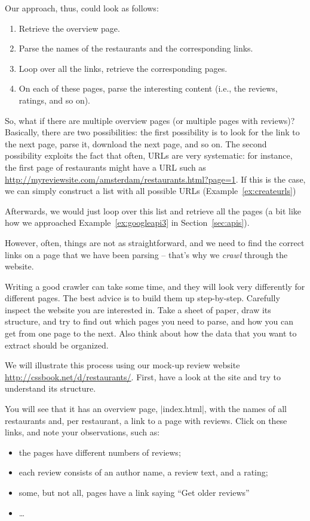 Our approach, thus, could look as follows:

\begin{enumerate}
	\item Retrieve the overview page.
	\item Parse the names of the restaurants and the corresponding links.
	\item Loop over all the links, retrieve the corresponding pages.
	\item On each of these pages, parse the interesting content (i.e., the reviews, ratings, and so on).
\end{enumerate}

So, what if there are multiple overview pages (or multiple pages with
reviews)? Basically, there are two possibilities: the first
possibility is to look for the link to the next page, parse it,
download the next page, and so on.  The second possibility exploits
the fact that often, URLs are very systematic: for instance, the first
page of restaurants might have a URL such as
\url{http://myreviewsite.com/amsterdam/restaurants.html?page=1}.  If this
is the case, we can simply construct a list with all possible URLs
(Example~\ref{ex:createurls})


Afterwards, we would just loop over this list and retrieve all the
pages (a bit like how we approached Example~\ref{ex:googleapi3} in Section~\ref{sec:apis}).

However, often, things are not as straightforward, and we need to find
the correct links on a page that we have been parsing -- that's why we
\emph{crawl} through the website.

Writing a good crawler can take some time, and they will look very
differently for different pages. The best advice is to build them up
step-by-step. Carefully inspect the website you are interested in.
Take a sheet of paper, draw its structure, and try to find out which
pages you need to parse, and how you can get from one page to the next.
Also think about how the data that you want to extract should be organized.

We will illustrate this process using our mock-up review website \url{http://cssbook.net/d/restaurants/}.
First, have a look at the site and try to understand its structure.

You will see that it has an overview page, |index.html|, with the
names of all restaurants and, per restaurant, a link to a page with reviews.
Click on these links, and note your observations, such as:
\begin{itemize}
\item the pages have different numbers of reviews;
\item each review consists of an author name, a review text, and a rating;
\item some, but not all, pages have a link saying ``Get older reviews''
\item \ldots
\end{itemize}

